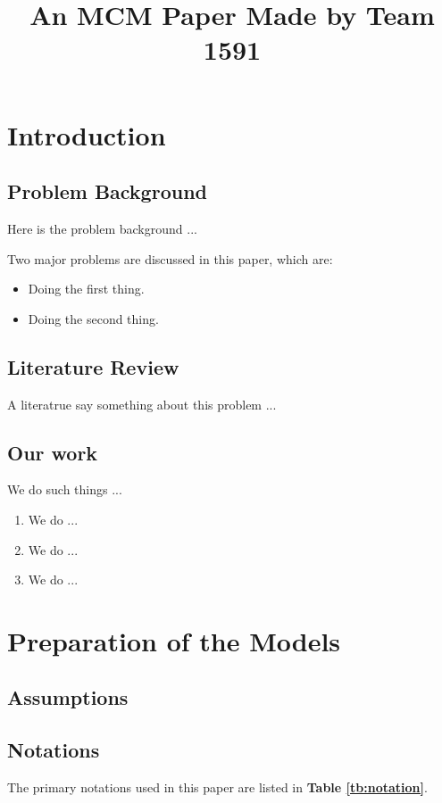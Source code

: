 \documentclass[12pt]{article}
\title{An MCM Paper Made by Team 1591}  %
\begin{document}
	
	\section{Introduction}
	\subsection{Problem Background}
	Here is the problem background ...
	
	Two major problems are discussed in this paper, which are:
	\begin{itemize}
		\item Doing the first thing.
		\item Doing the second thing.
	\end{itemize}
	
	\subsection{Literature Review}
	A literatrue\cite{1} say something about this problem ...
	
	\subsection{Our work}
	We do such things ...
	
	\begin{enumerate}[\bfseries 1.]
		\item We do ...
		\item We do ...
		\item We do ...
	\end{enumerate}
	
	\section{Preparation of the Models}
	\subsection{Assumptions}
	
	\subsection{Notations}
	The primary notations used in this paper are listed in \textbf{Table \ref{tb:notation}}.
	
\end{document}
